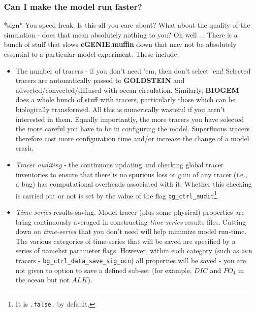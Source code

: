 \documentclass[11pt,fleqn]{book} %
\begin{document}
%
\subsubsection{Can I make the model run faster?}

*sign* You speed freak. Is this all you care about? What about the quality of the simulation - does that mean absolutely nothing to you? Oh well ...
There is a bunch of stuff that slows \textbf{cGENIE.muffin} down that may not be absolutely essential to a particular model experiment. These include:

\begin{itemize}[noitemsep]
\setlength{\itemindent}{.2in}

\item   The number of tracers - if you don't need 'em, then don't select 'em! Selected tracers are automatically passed to \textbf{GOLDSTEIN} and advected/convected/diffused with ocean circulation. Similarly, \textbf{BIOGEM} does a whole bunch of stuff with tracers, particularly those which can be biologically transformed. All this is numerically wasteful if you aren't interested in them. Equally importantly, the more tracers you have selected the more careful you have to be in configuring the model. Superfluous tracers therefore cost more configuration time and/or increase the change of a model crash.

\item \textit{Tracer auditing} - the  continuous updating and checking global tracer inventories to ensure that there is no spurious loss or gain of any tracer (i.e., a bug) has computational overheads associated with it. Whether this checking is carried out or not is set by the value of the flag \texttt{bg\_ctrl\_audit}\footnote{It is \texttt{.false.} by default.}.

\item \textit{Time-series} results saving. Model tracer (plus some physical) properties are bring continuously averaged in constructing \textit{time-series} results files. Cutting down on \textit{time-series} that you don't need will help minimize model run-time. The various categories of time-series that will be saved are specified by a series of namelist parameter flags. However, within each category (such as \texttt{ocn} tracers - \texttt{bg\_ctrl\_data\_save\_sig\_ocn}) all properties will be saved - you are not given to option to save a defined sub-set (for example, \(DIC\) and \(PO_{4}\) in the ocean but not \(ALK\)).


\end{itemize}
\end{document}
